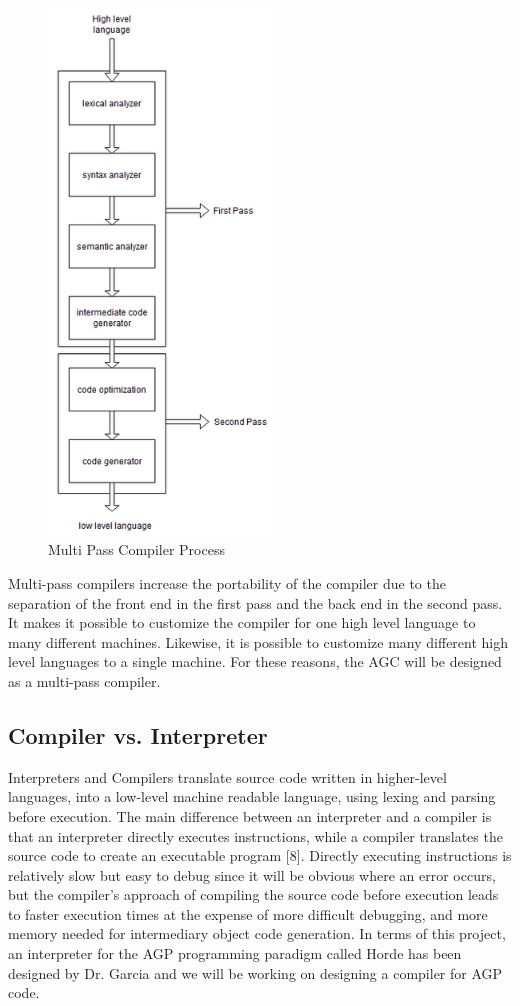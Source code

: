 \documentclass[11pt]{article}
\begin{document}
\begin{figure}[hbt]
   \begin{center}
     \includegraphics[width=60mm]{figure3.png}
   \end{center}
  \caption{Multi Pass Compiler Process}
  \label{fig-sysdesov}
 \end{figure}
 

Multi-pass compilers increase the portability of the compiler due to the separation of the front end in the first pass and the back end in the second pass. It makes it possible to customize the compiler for one high level language to many different machines. Likewise, it is possible to customize many different high level languages to a single machine. For these reasons, the AGC will be designed as a multi-pass compiler.


\subsection{Compiler vs. Interpreter}

Interpreters and Compilers translate source code written in higher-level languages, into a low-level machine readable language, using lexing and parsing before execution. The main difference between an interpreter and a compiler is that an interpreter directly executes instructions, while a compiler translates the source code to create an executable program [8]. Directly executing instructions is relatively slow but easy to debug since it will be obvious where an error occurs, but the compiler’s approach of compiling the source code before execution leads to faster execution times at the expense of more difficult debugging, and more memory needed for intermediary object code generation. In terms of this project, an interpreter for the AGP programming paradigm called Horde has been designed by Dr. Garcia and we will be working on designing a compiler for AGP code.
\end{document}
